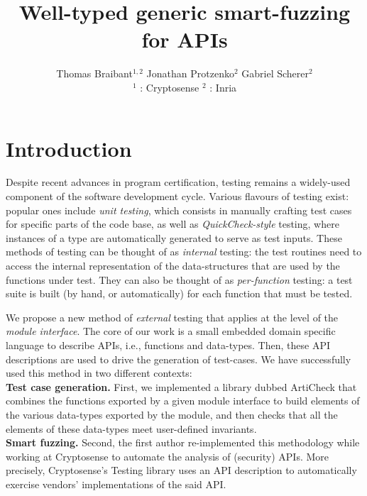 \documentclass[twocolumn,9pt]{article}
\newcommand{\acheck}{ArtiCheck\xspace}
\begin{document}
\date{}

\title{\vspace{-2cm}Well-typed generic smart-fuzzing for APIs}
\author{Thomas Braibant$^{1,2}$
  \quad Jonathan Protzenko$^{2}$
  \quad Gabriel Scherer$^{2}$ \\
  ${}^1$ : Cryptosense \quad ${}^2$ : Inria
}

\maketitle


\section{Introduction}
Despite recent advances in program certification, testing remains a
widely-used component of the software development cycle. Various
flavours of testing exist: popular ones include \emph{unit testing},
which consists in manually crafting test cases for specific parts of
the code base, as well as \emph{QuickCheck-style} testing, where
instances of a type are automatically generated to serve as test
inputs.
%
These methods of testing can be thought of as \emph{internal} testing:
the test routines need to access the internal representation of the
data-structures that are used by the functions under test. They can
also be thought of as \emph{per-function} testing: a test suite is
built (by hand, or automatically) for each function that must be
tested.

We propose a new method of \emph{external} testing that applies at the
level of the \emph{module interface}. The core of our work is a small
embedded domain specific language to describe APIs, i.e., functions
and data-types. Then, these API descriptions are used to drive the
generation of test-cases.
%
We have successfully used this method in two different contexts:
%
\\
\textbf{Test case generation.} First, we implemented a library dubbed
\acheck that combines the functions exported by a given module
interface to build elements of the various data-types exported by the
module, and then checks that all the elements of these data-types meet
user-defined invariants.
\\
\textbf{Smart fuzzing.} Second, the first author re-implemented this
methodology while working at Cryptosense to automate the analysis of
(security) APIs. More precisely, Cryptosense's Testing library uses an
API description to automatically exercise vendors' implementations of
the said API.
\end{document}
